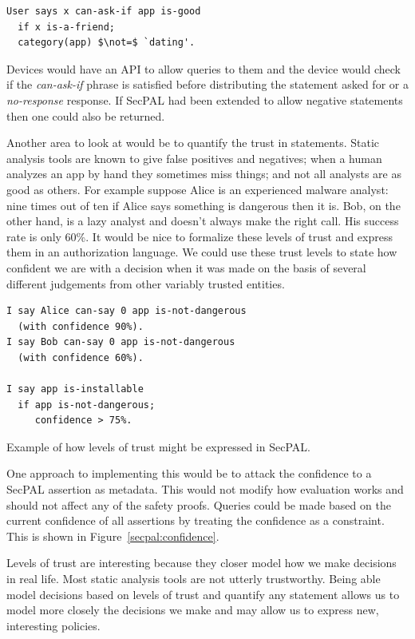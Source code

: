 \documentclass[a4paper]{article}
\begin{document}
\begin{lstlisting}[language=SecPAL,mathescape=true]
User says x can-ask-if app is-good
  if x is-a-friend;
  category(app) $\not=$ `dating'.
\end{lstlisting}

Devices would have an API to allow queries to them and the device would check if
the \emph{can-ask-if} phrase is satisfied before distributing the statement
asked for or a \emph{no-response} response.  If SecPAL had been extended
to allow negative statements then one could also be returned.

Another area to look at would be to quantify the trust in statements. Static
analysis tools are known to give false positives and negatives; when a human
analyzes an app by hand they sometimes miss things; and not all analysts are as
good as others.  For example suppose Alice is an experienced malware analyst:
nine times out of ten if Alice says something is dangerous then it is.  Bob, on
the other hand, is a lazy analyst and doesn't always make the right call.  His
success rate is only 60\%.  It would be nice to formalize these levels of trust
and express them in an authorization language. We could use these trust levels
to state how confident we are with a decision when it was made on the basis of
several different judgements from other variably trusted entities.

\begin{marginfigure}
  \begin{lstlisting}[language=SecPAL]
I say Alice can-say 0 app is-not-dangerous 
  (with confidence 90%).
I say Bob can-say 0 app is-not-dangerous
  (with confidence 60%).

I say app is-installable 
  if app is-not-dangerous;
     confidence > 75%.
  \end{lstlisting}
  \caption{Example of how levels of trust might be expressed in SecPAL.}
  \label{secpal:confidence}
\end{marginfigure}

One approach to implementing this would be to attack the confidence to a SecPAL
assertion as metadata.  This would not modify how evaluation works
and should not affect any of the safety proofs.  Queries could be made based on
the current confidence of all assertions by treating the confidence as a
constraint.  This is shown in Figure~\ref{secpal:confidence}.

Levels of trust are interesting because they closer model how we make decisions
in real life.  Most static analysis tools are not utterly trustworthy. Being
able model decisions based on levels of trust and quantify any statement allows
us to model more closely the decisions we make and may allow us to express new,
interesting policies.
\end{document}
